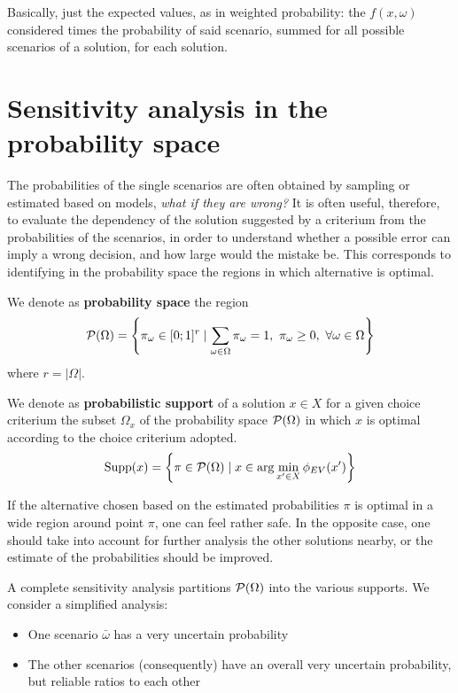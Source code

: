 Basically, just the expected values, as in weighted probability: the $f(x, \omega)$ considered times the probability of said scenario, summed for all possible scenarios of a solution, for each solution.

\section{Sensitivity analysis in the probability space}
\label{sec:sensanalysisprobspace}

The probabilities of the single scenarios are often obtained by sampling or estimated based on models, \textit{what if they are wrong?} It is often useful, therefore, to evaluate the dependency of the solution suggested by a criterium from the probabilities of the scenarios, in order to understand whether a possible error can imply a wrong decision, and how large would the mistake be. This corresponds to identifying in the probability space the regions in which alternative is optimal. \\

\begin{definition}
	We denote as \textbf{probability space} the region
	$$ \P (\Omega) = \left\{\pi_\omega \in [0;1]^r \mid \sum_{\omega \in \Omega} \pi_\omega = 1,\ \pi_\omega \geq 0, \ \forall \omega \in \Omega \right\} $$
	where $r = |\Omega|$.  \\
\end{definition}

\begin{definition}
	We denote as \textbf{probabilistic support} of a solution $x \in X$ for a given choice criterium the subset $\Omega_x$ of the probability space $\P (\Omega)$ in which $x$ is optimal according to the choice criterium adopted.
	$$ \supp (x) = \left\{\pi \in \P (\Omega) \mid x \in \arg \min_{x' \in X} \phi_{EV} (x') \right\}$$
\end{definition}

If the alternative chosen based on the estimated probabilities $\pi$ is optimal in a wide region around point $\pi$, one can feel rather safe. In the opposite case, one should take into account for further analysis the other solutions nearby, or the estimate of the probabilities should be improved. 

A complete sensitivity analysis partitions $\P (\Omega)$ into the various supports. We consider a simplified analysis: 
\begin{itemize}
	\item One scenario $\bar \omega$ has a very uncertain probability
	
	\item The other scenarios (consequently) have an overall very uncertain probability, but reliable ratios to each other
\end{itemize}

